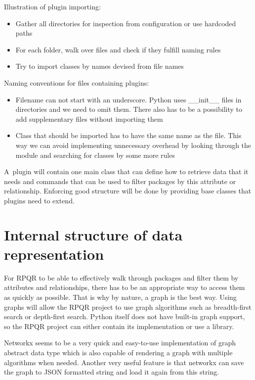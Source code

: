 Illustration of plugin importing:
\begin{itemize}
  \item Gather all directories for inspection from configuration or use hardcoded paths
  \item For each folder, walk over files and check if they fulfill naming rules
  \item Try to import classes by names devised from file names
\end{itemize}

Naming conventions for files containing plugins:
\begin{itemize}
  \item Filename can not start with an underscore. Python uses \_\_init\_\_ files
  in directories and we need to omit them. There also has to be a possibility to add supplementary files without importing them
  \item Class that should be imported has to have the same name as the file. This way we can avoid
  implementing unnecessary overhead by looking through the module and searching for classes by some
  more rules
\end{itemize}

A~plugin will contain one main class that can define how to retrieve data that it needs and commands
that can be used to filter packages by this attribute or relationship. Enforcing good structure
will be done by providing base classes that plugins need to extend.

\newpage

\section{Internal structure of data representation}
For RPQR to be able to effectively walk through packages and filter them by attributes and relationships,
there has to be an appropriate way to access them as quickly as possible. That is why by nature, a graph
is the best way. Using graphs will allow the RPQR project to use graph algorithms such as breadth-first search
or depth-first search. Python itself does not have built-in graph support, so the RPQR project can either
contain its implementation or use a library.

Networkx seems to be a very quick and easy-to-use implementation of graph abstract data type which is
also capable of rendering a graph with multiple algorithms when needed. Another very useful feature
is that networkx can save the graph to JSON formatted string and load it again from this string.

